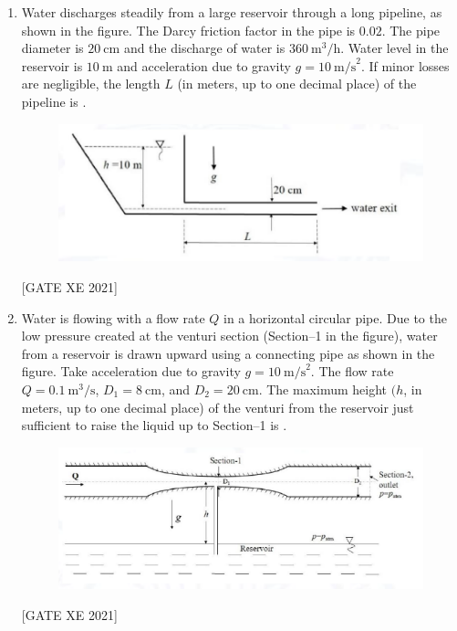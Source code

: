 \documentclass[journal,12pt,onecolumn]{IEEEtran}
\theoremstyle{remark}
\begin{document}
\begin{enumerate}
\hfill[GATE XE 2021]


\item Water discharges steadily from a large reservoir through a long pipeline, as shown in the figure. The Darcy friction factor in the pipe is $0.02$. The pipe diameter is $20\ \text{cm}$ and the discharge of water is $360\ \text{m}^3/\text{h}$. Water level in the reservoir is $10\ \text{m}$ and acceleration due to gravity $g=10\ \text{m/s}^2$. If minor losses are negligible, the length $L$ (in meters, up to one decimal place) of the pipeline is \underline{\hspace{2cm}}.

\begin{figure}[H]
      \centering
      \includegraphics[width=0.5\columnwidth]{figs/fig15.png}
      \caption{}
      \label{fig:placeholder}
  \end{figure}

\hfill[GATE XE 2021]


\item Water is flowing with a flow rate $Q$ in a horizontal circular pipe. Due to the low pressure created at the venturi section (Section–1 in the figure), water from a reservoir is drawn upward using a connecting pipe as shown in the figure. Take acceleration due to gravity $g=10\ \text{m/s}^2$. The flow rate $Q=0.1\ \text{m}^3/\text{s}$, $D_1=8\ \text{cm}$, and $D_2=20\ \text{cm}$. The maximum height $(h$, in meters, up to one decimal place) of the venturi from the reservoir just sufficient to raise the liquid up to Section–1 is \underline{\hspace{2cm}}.

\begin{figure}[H]
      \centering
      \includegraphics[width=0.5\columnwidth]{figs/fig16.png}
      \caption{}
      \label{fig:placeholder}
  \end{figure}

\hfill[GATE XE 2021]


\end{enumerate}
\end{document}
